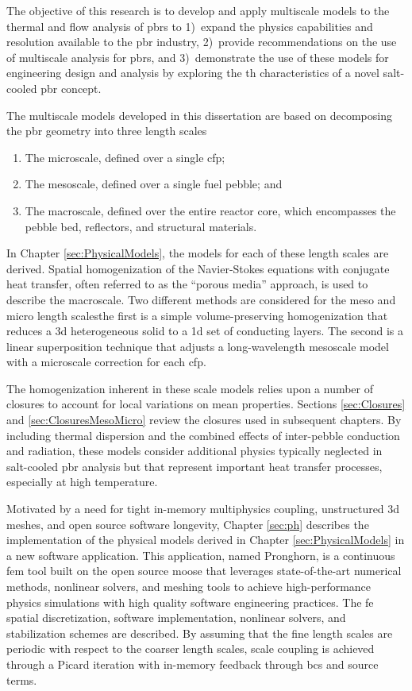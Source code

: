 The objective of this research is to develop and apply multiscale models to the thermal and flow analysis of \glspl{pbr} to 1)~expand the physics capabilities and resolution available to the \gls{pbr} industry, 2)~provide recommendations on the use of multiscale analysis for \glspl{pbr}, and 3)~demonstrate the use of these models for engineering design and analysis by exploring the \gls{th} characteristics of a novel salt-cooled \gls{pbr} concept.

The multiscale models developed in this dissertation are based on decomposing the \gls{pbr} geometry into three length scales\mdash

\begin{enumerate}
\item The microscale, defined over a single \gls{cfp};
\item The mesoscale, defined over a single fuel pebble; and
\item The macroscale, defined over the entire reactor core, which encompasses the pebble bed, reflectors, and structural materials.
\end{enumerate}

In Chapter \ref{sec:PhysicalModels}, the models for each of these length scales are derived. Spatial homogenization of the Navier-Stokes equations with conjugate heat transfer, often referred to as the ``porous media'' approach, is used to describe the macroscale. Two different methods are considered for the meso and micro length scales\mdash the first is a simple volume-preserving homogenization that reduces a \gls{3d} heterogeneous solid to a \gls{1d} set of conducting layers. The second is a linear superposition technique that adjusts a long-wavelength mesoscale model with a microscale correction for each \gls{cfp}. 

The homogenization inherent in these scale models relies upon a number of closures to account for local variations on mean properties. Sections \ref{sec:Closures} and \ref{sec:ClosuresMesoMicro} review the closures used in subsequent chapters. By including thermal dispersion and the combined effects of inter-pebble conduction and radiation, these models consider additional physics typically neglected in salt-cooled \gls{pbr} analysis \cite{xin_wang_thesis,scarlat} but that represent important heat transfer processes, especially at high temperature. 

Motivated by a need for tight in-memory multiphysics coupling, unstructured \gls{3d} meshes, and open source software longevity, Chapter \ref{sec:ph} describes the implementation of the physical models derived in Chapter \ref{sec:PhysicalModels} in a new software application. This application, named Pronghorn, is a continuous \gls{fem} tool built on the open source \gls{moose} that leverages state-of-the-art numerical methods, nonlinear solvers, and meshing tools to achieve high-performance physics simulations with high quality software engineering practices. The \gls{fe} spatial discretization, software implementation, nonlinear solvers, and stabilization schemes are described. By assuming that the fine length scales are periodic with respect to the coarser length scales, scale coupling is achieved through a Picard iteration with in-memory feedback through \glspl{bc} and source terms. 

